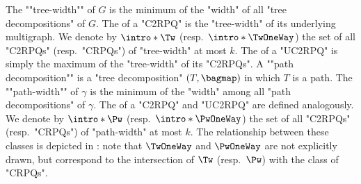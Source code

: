 The \AP""tree-width"" of $G$ is the minimum of the "width" of all "tree decompositions" of $G$. The  of a "C2RPQ" is the "tree-width" of its underlying multigraph. 
We denote by $\intro*\Tw$ (resp.\ $\intro*\TwOneWay$) the set of all "C2RPQs" (resp.\ "CRPQs") of "tree-width" at most $k$. The  of a "UC2RPQ" is simply the maximum of the "tree-width" of its "C2RPQs".
\AP
A ""path decomposition"" is a "tree decomposition" $(T,\bagmap)$ in which $T$ is a path. The \AP""path-width"" of $\gamma$ is the minimum of the "width" among all "path decompositions" of $\gamma$. The  of a "C2RPQ" and "UC2RPQ" are defined analogously. We denote by \AP$\intro*\Pw$ (resp.\ $\intro*\PwOneWay$) the set of all "C2RPQs" (resp.\ "CRPQs") of "path-width" at most $k$. The relationship between these classes is depicted in :
note that $\TwOneWay$ and $\PwOneWay$ are not explicitly drawn, but correspond to the
intersection of $\Tw$ (resp.\ $\Pw$) with the class of "CRPQs".

